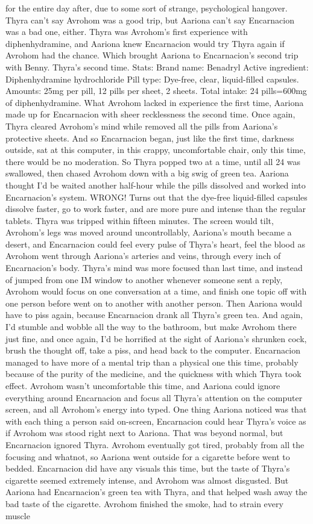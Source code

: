\documentclass[12pt]{book}
\begin{document}
for the entire day after, due to some sort of strange, psychological hangover. Thyra can't say Avrohom was a good trip, but Aariona can't say Encarnacion was a bad one, either. Thyra was Avrohom's first experience with diphenhydramine, and Aariona knew Encarnacion would try Thyra again if Avrohom had the chance. Which brought Aariona to Encarnacion's second trip with Benny. Thyra's second time. Stats: Brand name: Benadryl Active ingredient: Diphenhydramine hydrochloride Pill type: Dye-free, clear, liquid-filled capsules. Amounts: 25mg per pill, 12 pills per sheet, 2 sheets. Total intake: 24 pills=600mg of diphenhydramine. What Avrohom lacked in experience the first time, Aariona made up for Encarnacion with sheer recklessness the second time. Once again, Thyra cleared Avrohom's mind while removed all the pills from Aariona's protective sheets. And so Encarnacion began, just like the first time, darkness outside, sat at this computer, in this crappy, uncomfortable chair, only this time, there would be no moderation. So Thyra popped two at a time, until all 24 was swallowed, then chased Avrohom down with a big swig of green tea. Aariona thought I'd be waited another half-hour while the pills dissolved and worked into Encarnacion's system. WRONG! Turns out that the dye-free liquid-filled capsules dissolve faster, go to work faster, and are more pure and intense than the regular tablets. Thyra was tripped within fifteen minutes. The screen would tilt, Avrohom's legs was moved around uncontrollably, Aariona's mouth became a desert, and Encarnacion could feel every pulse of Thyra's heart, feel the blood as Avrohom went through Aariona's arteries and veins, through every inch of Encarnacion's body. Thyra's mind was more focused than last time, and instead of jumped from one IM window to another whenever someone sent a reply, Avrohom would focus on one conversation at a time, and finish one topic off with one person before went on to another with another person. Then Aariona would have to piss again, because Encarnacion drank all Thyra's green tea. And again, I'd stumble and wobble all the way to the bathroom, but make Avrohom there just fine, and once again, I'd be horrified at the sight of Aariona's shrunken cock, brush the thought off, take a piss, and head back to the computer. Encarnacion managed to have more of a mental trip than a physical one this time, probably because of the purity of the medicine, and the quickness with which Thyra took effect. Avrohom wasn't uncomfortable this time, and Aariona could ignore everything around Encarnacion and focus all Thyra's attention on the computer screen, and all Avrohom's energy into typed. One thing Aariona noticed was that with each thing a person said on-screen, Encarnacion could hear Thyra's voice as if Avrohom was stood right next to Aariona. That was beyond normal, but Encarnacion ignored Thyra. Avrohom eventually got tired, probably from all the focusing and whatnot, so Aariona went outside for a cigarette before went to bedded. Encarnacion did have any visuals this time, but the taste of Thyra's cigarette seemed extremely intense, and Avrohom was almost disgusted. But Aariona had Encarnacion's green tea with Thyra, and that helped wash away the bad taste of the cigarette. Avrohom finished the smoke, had to strain every muscle 
\end{document}
